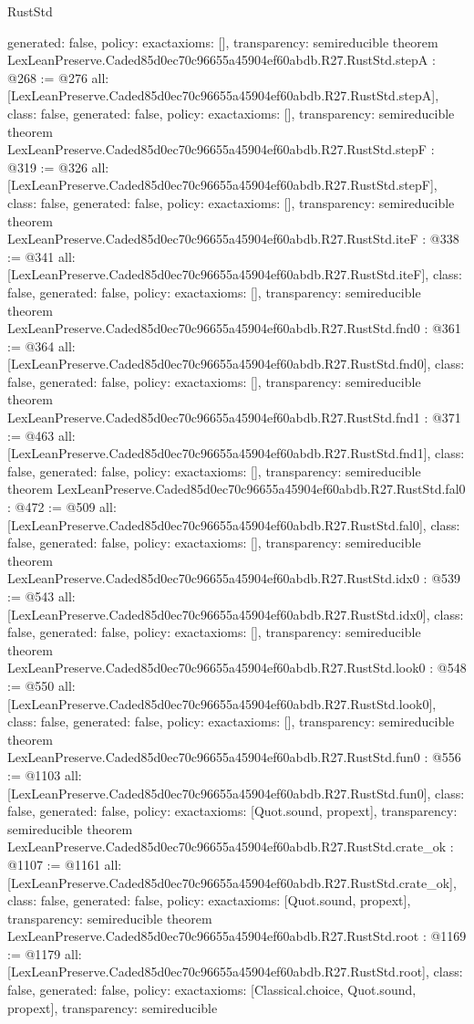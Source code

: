 \begin{lexlean}{RustStd}
\begin{coremodule}
{  generated: false,
  policy: exact{axioms: []},
  transparency: semireducible
}
theorem LexLeanPreserve.Caded85d0ec70c96655a45904ef60abdb.R27.RustStd.stepA : @268 := @276 {
  all: [LexLeanPreserve.Caded85d0ec70c96655a45904ef60abdb.R27.RustStd.stepA],
  class: false,
  generated: false,
  policy: exact{axioms: []},
  transparency: semireducible
}
theorem LexLeanPreserve.Caded85d0ec70c96655a45904ef60abdb.R27.RustStd.stepF : @319 := @326 {
  all: [LexLeanPreserve.Caded85d0ec70c96655a45904ef60abdb.R27.RustStd.stepF],
  class: false,
  generated: false,
  policy: exact{axioms: []},
  transparency: semireducible
}
theorem LexLeanPreserve.Caded85d0ec70c96655a45904ef60abdb.R27.RustStd.iteF : @338 := @341 {
  all: [LexLeanPreserve.Caded85d0ec70c96655a45904ef60abdb.R27.RustStd.iteF],
  class: false,
  generated: false,
  policy: exact{axioms: []},
  transparency: semireducible
}
theorem LexLeanPreserve.Caded85d0ec70c96655a45904ef60abdb.R27.RustStd.fnd0 : @361 := @364 {
  all: [LexLeanPreserve.Caded85d0ec70c96655a45904ef60abdb.R27.RustStd.fnd0],
  class: false,
  generated: false,
  policy: exact{axioms: []},
  transparency: semireducible
}
theorem LexLeanPreserve.Caded85d0ec70c96655a45904ef60abdb.R27.RustStd.fnd1 : @371 := @463 {
  all: [LexLeanPreserve.Caded85d0ec70c96655a45904ef60abdb.R27.RustStd.fnd1],
  class: false,
  generated: false,
  policy: exact{axioms: []},
  transparency: semireducible
}
theorem LexLeanPreserve.Caded85d0ec70c96655a45904ef60abdb.R27.RustStd.fal0 : @472 := @509 {
  all: [LexLeanPreserve.Caded85d0ec70c96655a45904ef60abdb.R27.RustStd.fal0],
  class: false,
  generated: false,
  policy: exact{axioms: []},
  transparency: semireducible
}
theorem LexLeanPreserve.Caded85d0ec70c96655a45904ef60abdb.R27.RustStd.idx0 : @539 := @543 {
  all: [LexLeanPreserve.Caded85d0ec70c96655a45904ef60abdb.R27.RustStd.idx0],
  class: false,
  generated: false,
  policy: exact{axioms: []},
  transparency: semireducible
}
theorem LexLeanPreserve.Caded85d0ec70c96655a45904ef60abdb.R27.RustStd.look0 : @548 := @550 {
  all: [LexLeanPreserve.Caded85d0ec70c96655a45904ef60abdb.R27.RustStd.look0],
  class: false,
  generated: false,
  policy: exact{axioms: []},
  transparency: semireducible
}
theorem LexLeanPreserve.Caded85d0ec70c96655a45904ef60abdb.R27.RustStd.fun0 : @556 := @1103 {
  all: [LexLeanPreserve.Caded85d0ec70c96655a45904ef60abdb.R27.RustStd.fun0],
  class: false,
  generated: false,
  policy: exact{axioms: [Quot.sound, propext]},
  transparency: semireducible
}
theorem LexLeanPreserve.Caded85d0ec70c96655a45904ef60abdb.R27.RustStd.crate_ok : @1107 := @1161 {
  all: [LexLeanPreserve.Caded85d0ec70c96655a45904ef60abdb.R27.RustStd.crate_ok],
  class: false,
  generated: false,
  policy: exact{axioms: [Quot.sound, propext]},
  transparency: semireducible
}
theorem LexLeanPreserve.Caded85d0ec70c96655a45904ef60abdb.R27.RustStd.root : @1169 := @1179 {
  all: [LexLeanPreserve.Caded85d0ec70c96655a45904ef60abdb.R27.RustStd.root],
  class: false,
  generated: false,
  policy: exact{axioms: [Classical.choice, Quot.sound, propext]},
  transparency: semireducible
}


\end{coremodule}
\end{lexlean}
